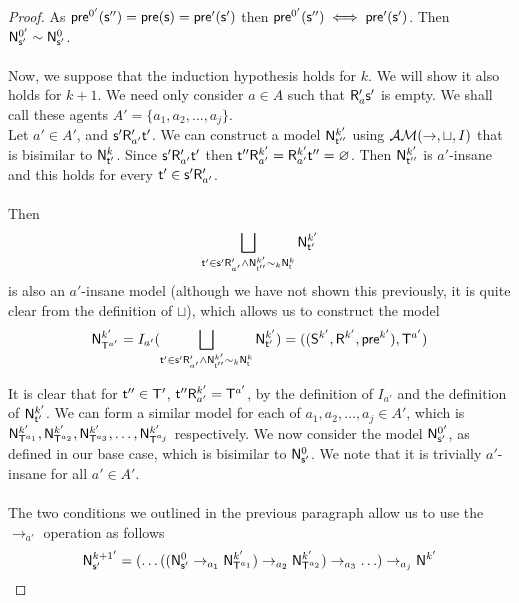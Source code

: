 \begin{proof}
	As $\evpr^{0'}(\evs'') = \evpr(\evs) = \evpr'(\evs')$ then $\evpr^{0'}(\evs'') \iff
  \evpr'(\evs')$.
	Then $\evM^{0'}_{\evs'} \sim \evM^0_{\evs'}$.\\
	\\
	Now, we suppose that the induction hypothesis holds for $k$.
	We will show it also holds for $k+1$.
	We need only consider $a \in A$ such that $\evR'_a \evs'$ is empty.
	We shall call these agents $A' = \{a_1,a_2,\ldots,a_j\}$.
  \\
  Let $a' \in A'$, and $\evs' \evR'_{a'} \evt'$.
  We can construct a model $\evM^{k'}_{\evt''}$ using $\EM(\to,\sqcup,I)$ that is
  bisimilar to $\evM^k_{\evt'}$.
  Since $\evs' \evR'_{a'} \evt'$ then $\evt'' \evR^{k'}_{a'} = \evR^{k'}_{a'}
  \evt'' = \varnothing$.
  Then $\evM^{k'}_{\evt''}$ is $a'$-insane and this holds for every $\evt' \in
  \evs' \evR'_{a'}$.\\
  \\
  Then
  \[
    \bigsqcup_{\evt' \in \evs' \evR'_{a'} \land \evM^{k'}_{\evt''} \sim_k
      \evM^k_\evt} \evM^{k'}_{\evt'}
  \]
  is also an $a'$-insane model (although we have not shown this previously, it
  is quite clear from the definition of $\sqcup$), which allows us to construct the model
  \[
    \evM^{k'}_{\evT^{a'}} = I_{a'}(\bigsqcup_{\evt' \in \evs' \evR'_{a'} \land \evM^{k'}_{\evt''} \sim_k
      \evM^k_\evt} \evM^{k'}_{\evt'}) = ((\evS^{k'},\evR^{k'},\evpr^{k'}),\evT^{a'})
  \]

  It is clear that for $\evt'' \in \evT'$, $\evt'' \evR^{k'}_{a'} = \evT^{a'}$, by the
  definition of $I_{a'}$ and the definition of $\evM^{k'}_{\evt'}$.
  We can form a similar model for each of $a_1,a_2,\ldots,a_j \in A'$, which is
  $\evM^{k'}_{\evT^{a_1}}, \evM^{k'}_{\evT^{a_2}}, \evM^{k'}_{\evT^{a_3}},
  \ldots, \evM^{k'}_{\evT^{a_j}}$ respectively.
  We now consider the model $\evM^{0'}_{\evs'}$, as defined in our base case,
  which is bisimilar to $\evM^0_{\evs'}$.
  We note that it is trivially $a'$-insane for all $a' \in A'$.\\
  \\
  The two conditions we outlined in the previous paragraph allow us to use the $\to_{a'}$ operation as follows
  \[
    \evM^{k+1'}_{\evs'} = (\ldots((\evM^0_{\evs'} \to_{a_1}
            \evM^{k'}_{\evT^{a_1}}) \to_{a_2} \evM^{k'}_{\evT^{a_2}}) \to_{a_3}
        \ldots ) \to_{a_j} \evM^{k'}
  \]


\end{proof}
